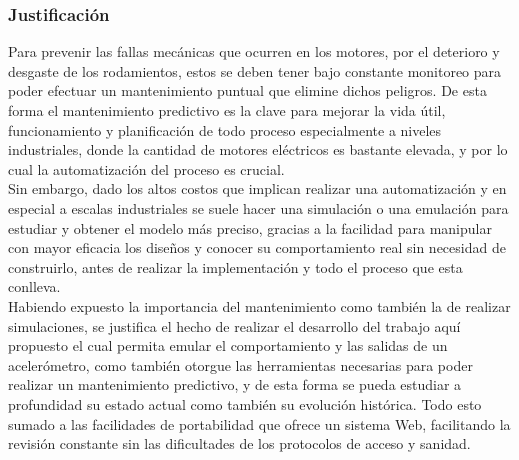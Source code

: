 
\subsubsection{Justificación}

Para prevenir las fallas mecánicas que ocurren en los motores, por el deterioro y desgaste de los rodamientos, estos se deben tener bajo constante monitoreo para poder efectuar un mantenimiento puntual que elimine dichos peligros. De esta forma el mantenimiento predictivo es la clave para mejorar la vida útil, funcionamiento y planificación de todo proceso especialmente a niveles industriales, donde la cantidad de motores eléctricos es bastante elevada, y por lo cual la automatización del proceso es crucial.\\


Sin embargo, dado los altos costos que implican realizar una automatización y en especial a escalas industriales se suele hacer una simulación o una emulación para estudiar y obtener el modelo más preciso, gracias a la facilidad para manipular con mayor eficacia los diseños y conocer su comportamiento real sin necesidad de construirlo, antes de realizar la implementación y todo el proceso que esta conlleva.\\


Habiendo expuesto la importancia del mantenimiento como también la de realizar simulaciones, se justifica el hecho de realizar el desarrollo del trabajo aquí propuesto el cual permita emular el comportamiento y las salidas de un acelerómetro, como también otorgue las herramientas necesarias para poder realizar un mantenimiento predictivo, y de esta forma se pueda estudiar a profundidad su estado actual como también su evolución histórica. Todo esto sumado a las facilidades de portabilidad que ofrece un sistema Web, facilitando la revisión constante sin las dificultades de los protocolos de acceso y sanidad.\\